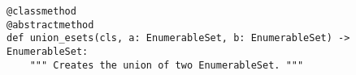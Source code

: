 \par\begin{minipage}{74ex}
\begin{verbatim}
@classmethod
@abstractmethod
def union_esets(cls, a: EnumerableSet, b: EnumerableSet) -> EnumerableSet:
    """ Creates the union of two EnumerableSet. """
\end{verbatim}
\end{minipage}\par
